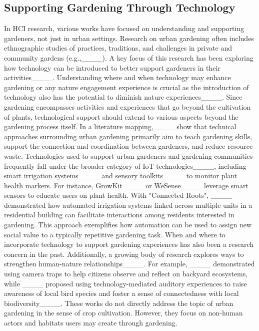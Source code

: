 \subsection{Supporting Gardening Through Technology}\label{subsec:tech-garden-rel}
In HCI research, various works have focused on understanding and supporting gardeners, not just in urban settings. Research on urban gardening often includes ethnographic studies of practices, traditions, and challenges in private and community gardens (e.g.,____). A key focus of this research has been exploring how technology can be introduced to better support gardeners in their activities____. Understanding where and when technology may enhance gardening or any nature engagement experience is crucial as the introduction of technology also has the potential to diminish nature experiences____.
Since gardening encompasses activities and experiences that go beyond the cultivation of plants, technological support should extend to various aspects beyond the gardening process itself. 
In a literature mapping,____ show that technical approaches surrounding urban gardening primarily aim to teach gardening skills, support the connection and coordination between gardeners, and reduce resource waste. Technologies used to support urban gardeners and gardening communities frequently fall under the broader category of IoT technologies____, including smart irrigation systems____ and sensory toolkits____ to monitor plant health markers. For instance, GrowKit____ or WeSense____ leverage smart sensors to educate users on plant health.  With "Connected Roots", ____ demonstrated how automated irrigation systems linked across multiple units in a residential building can facilitate interactions among residents interested in gardening. This approach exemplifies how automation can be used to assign new social value to a typically repetitive gardening task. When and where to incorporate technology to support gardening experiences has also been a research concern in the past. 
Additionally, a growing body of research explores ways to strengthen human-nature relationships____. For example, ____ demonstrated using camera traps to help citizens observe and reflect on backyard ecosystems, while ____ proposed using technology-mediated auditory experiences to raise awareness of local bird species and foster a sense of connectedness with local biodiversity____. These works do not directly address the topic of urban gardening in the sense of crop cultivation. However, they focus on non-human actors and habitats users may create through gardening.\\ 

